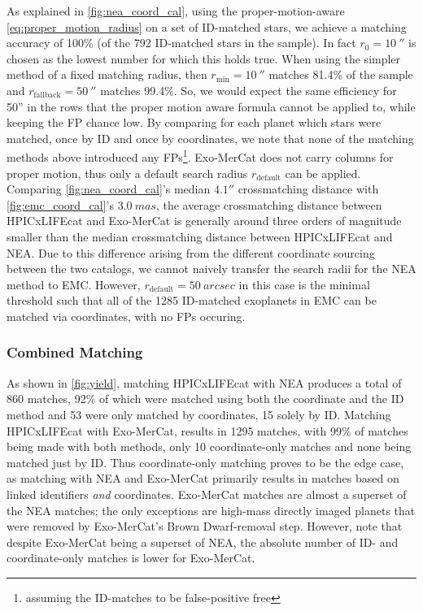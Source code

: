 As explained in \cref{fig:nea_coord_cal}, using the proper-motion-aware \cref{eq:proper_motion_radius} on a set of ID-matched stars, we achieve a matching accuracy of 100\% (of the 792 ID-matched stars in the sample). In fact $r_0 = \qty{10}{''}$ is chosen as the lowest number for which this holds true. When using the simpler method of a fixed matching radius, then $r_{\min}=\qty{10}{''}$ matches 81.4\% of the sample and $r_{\text{fallback}} = \qty{50}{''}$ matches 99.4\%. So, we would expect the same efficiency for 50'' in the rows that the proper motion aware formula cannot be applied to, while keeping the FP chance low. By comparing for each planet which stars were matched, once by ID and once by coordinates, we note that none of the matching methods above introduced any FPs\footnote{assuming the ID-matches to be false-positive free}.
Exo-MerCat does not carry columns for proper motion, thus only a default search radius $r_{\text{default}}$ can be applied. Comparing \cref{fig:nea_coord_cal}'s median ${4.1''}$ crossmatching distance with \cref{fig:emc_coord_cal}'s $\qty{3.0}{mas}$, the average crossmatching distance between HPICxLIFEcat and Exo-MerCat is generally around three orders of magnitude smaller than the median crossmatching distance between HPICxLIFEcat and NEA. Due to this difference arising from the different coordinate sourcing between the two catalogs, we cannot naively transfer the search radii for the NEA method to EMC. However, $r_{\text{default}} = \qty{50}{arcsec}$ in this case is the minimal threshold such that all of the 1285 ID-matched exoplanets in EMC can be matched via coordinates, with no FPs occuring.
\subsubsection{Combined Matching}
As shown in \cref{fig:yield}, matching HPICxLIFEcat with NEA produces a total of 860 matches, 92\% of which were matched using both the coordinate and the ID method and 53 were only matched by coordinates, 15 solely by ID. Matching HPICxLIFEcat with Exo-MerCat, results in 1295 matches, with 99\% of matches being made with both methods, only 10 coordinate-only matches and none being matched just by ID.  Thus coordinate-only matching proves to be the edge case, as matching with NEA and Exo-MerCat primarily results in matches based on linked identifiers \textit{and} coordinates. Exo-MerCat matches are almost a superset of the NEA matches; the only exceptions are high-mass directly imaged planets that were removed by Exo-MerCat's Brown Dwarf-removal step. However, note that despite Exo-MerCat being a superset of NEA, the absolute number of ID- and coordinate-only matches is lower for Exo-MerCat. 
